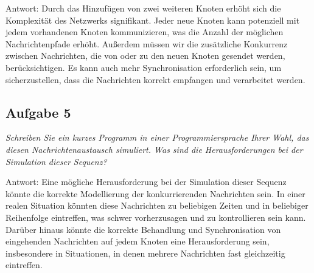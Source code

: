 \documentclass{article}
\begin{document}
Antwort: Durch das Hinzufügen von zwei weiteren Knoten erhöht sich die Komplexität des Netzwerks signifikant. Jeder neue Knoten kann potenziell mit jedem vorhandenen Knoten kommunizieren, was die Anzahl der möglichen Nachrichtenpfade erhöht. Außerdem müssen wir die zusätzliche Konkurrenz zwischen Nachrichten, die von oder zu den neuen Knoten gesendet werden, berücksichtigen. Es kann auch mehr Synchronisation erforderlich sein, um sicherzustellen, dass die Nachrichten korrekt empfangen und verarbeitet werden.

\subsection{Aufgabe 5}
\textit{Schreiben Sie ein kurzes Programm in einer Programmiersprache Ihrer Wahl, das diesen Nachrichtenaustausch simuliert. Was sind die Herausforderungen bei der Simulation dieser Sequenz?}

Antwort: Eine mögliche Herausforderung bei der Simulation dieser Sequenz könnte die korrekte Modellierung der konkurrierenden Nachrichten sein. In einer realen Situation könnten diese Nachrichten zu beliebigen Zeiten und in beliebiger Reihenfolge eintreffen, was schwer vorherzusagen und zu kontrollieren sein kann. Darüber hinaus könnte die korrekte Behandlung und Synchronisation von eingehenden Nachrichten auf jedem Knoten eine Herausforderung sein, insbesondere in Situationen, in denen mehrere Nachrichten fast gleichzeitig eintreffen.
\end{document}
